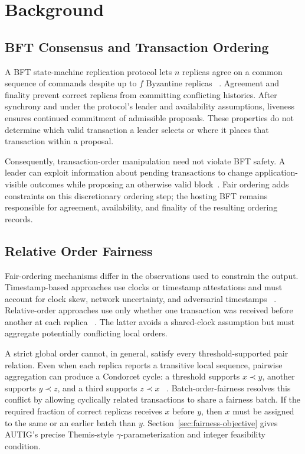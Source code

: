 \section{Background}
\label{sec:background}

\subsection{BFT Consensus and Transaction Ordering}

A BFT state-machine replication protocol lets $n$ replicas agree on a common
sequence of commands despite up to $f$ Byzantine replicas
~\cite{schneider1990implementing,castro1999practical,yin2019hotstuff}.
Agreement and finality prevent correct replicas from committing conflicting
histories.  After synchrony and under the protocol's leader and availability
assumptions, liveness ensures continued commitment of admissible proposals.
These properties do not determine which valid transaction a leader selects or
where it places that transaction within a proposal.

Consequently, transaction-order manipulation need not violate BFT safety.  A
leader can exploit information about pending transactions to change
application-visible outcomes while proposing an otherwise valid
block~\cite{daian2020flash,heimbach2022sok,malkhi2022maximal}.  Fair ordering adds
constraints on this discretionary ordering step; the hosting BFT remains
responsible for agreement, availability, and finality of the resulting
ordering records.

\subsection{Relative Order Fairness}
\label{sec:background_order_fairness}

Fair-ordering mechanisms differ in the observations used to constrain the
output.  Timestamp-based approaches use clocks or timestamp attestations and
must account for clock skew, network uncertainty, and adversarial timestamps
~\cite{zhang2020byzantine,kursawe2020wendy}.  Relative-order approaches use
only whether one transaction was received before another at each replica
~\cite{kelkar2020order,kelkar2023themis}.  The latter avoids a shared-clock
assumption but must aggregate potentially conflicting local orders.

A strict global order cannot, in general, satisfy every threshold-supported
pair relation.  Even when each replica reports a transitive local sequence,
pairwise aggregation can produce a Condorcet cycle: a threshold supports
$x\prec y$, another supports $y\prec z$, and a third supports $z\prec x$
~\cite{gehrlein1983condorcet}.  Batch-order-fairness resolves this conflict by
allowing cyclically related transactions to share a fairness batch.  If the
required fraction of correct replicas receives $x$ before $y$, then $x$ must
be assigned to the same or an earlier batch than $y$.
Section~\ref{sec:fairness-objective} gives AUTIG's precise Themis-style
$\gamma$-parameterization and integer feasibility condition.

